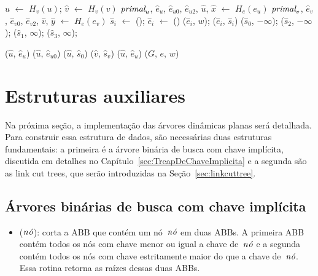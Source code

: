\begin{algorithm}[htb]
\caption{\MSFaddEdge($G$, $e$, $u$, $e_u$, $v$, $e_v$, $w$)}
\label{Algo:MSFaddEdge}
\begin{algorithmic}[1]

\State $\hat u$ $\gets$ $H_v(u)$; $\hat v$ $\gets$ $H_v(v)$
\State $\textit{primal}_u$, $\hat e_u$, $\hat e_{u0}$, $\hat e_{u2}$, $\hat u$, $\hat x$ $\gets$ $H_e(e_u)$
\State $\textit{primal}_v$, $\hat e_v$, $\hat e_{v0}$, $\hat e_{v2}$, $\hat v$, $\hat y$ $\gets$ $H_e(e_v)$
\State $\hat s_i$ $\gets$ \LCOMakeNode(); $\hat e_i$ $\gets$ \LCOMakeNode()
\State  \LCOAddCost($\hat e_i$, $w$);
\State \LCOLink($\hat e_i$, $\hat s_i$)
\EndFor
\State \LCOAddCost($\hat s_0$, $-\infty$); \LCOAddCost($\hat s_2$, $-\infty$);
\State \LCOAddCost($\hat s_1$, $\infty$); \LCOAddCost($\hat s_3$, $\infty$);




\Else
{}
\State \LCOCycle($\hat u$, $\hat e_u$)
\Else
\State \LCOCycle($\hat u$, $\hat e_{u0}$)
\EndIf
\State \LCOMerge($\hat u$, $\hat s_0$)
\State \LCOMerge($\hat v$, $\hat s_v$)
\State \LCOCycle($\hat u$, $\hat e_u$)
\State \MSFupdate($G$, $e$, $w$)
\EndIf
\end{algorithmic}
\end{algorithm}



\section{Estruturas auxiliares}

Na próxima seção, a implementação das árvores dinâmicas planas será detalhada. Para construir essa estrutura de dados, são necessárias duas estruturas fundamentais: a primeira é a árvore binária de busca com chave implícita, discutida em detalhes no Capítulo~\ref{sec:TreapDeChaveImplicita} e a segunda são as link cut trees, que serão introduzidas na Seção~\ref{sec:linkcuttree}.



\subsection{Árvores binárias de busca com chave implícita}

\begin{itemize}
\item \treapSplitRight($\mathit{n\acute{o}}$): corta a ABB que contém um nó~$\mathit{n\acute{o}}$ em duas ABBs. A primeira ABB contém todos os nós com chave menor ou igual a chave de~$\mathit{n\acute{o}}$ e a segunda contém todos os nós com chave estritamente maior do que a chave de~$\mathit{n\acute{o}}$. Essa rotina retorna as raízes dessas duas ABBs.
\end{itemize}

